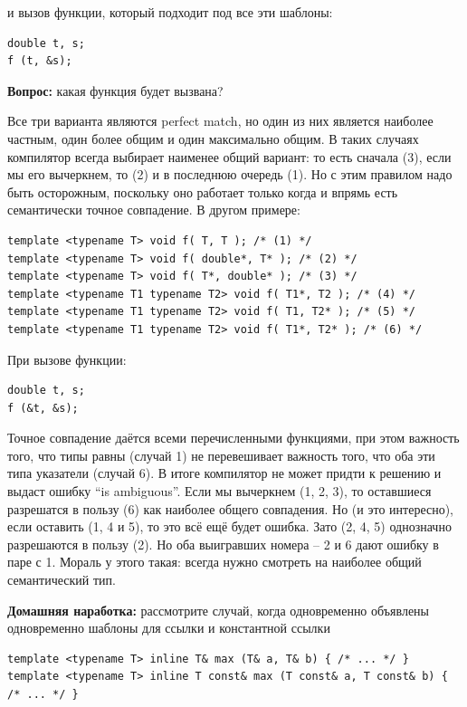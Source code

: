 \documentclass[a4paper,12pt,oneside]{article}
\begin{document}
и вызов функции, который подходит под все эти шаблоны:

\begin{lstlisting}
double t, s;
f (t, &s);
\end{lstlisting}

\textbf{Вопрос:} какая функция будет вызвана?

Все три варианта являются perfect match, но один из них является наиболее частным, один более общим и один максимально общим. В таких случаях компилятор всегда выбирает наименее общий вариант: то есть сначала (3), если мы его вычеркнем, то (2) и в последнюю очередь (1). Но с этим правилом надо быть осторожным, поскольку оно работает только когда и впрямь есть семантически точное совпадение. В другом примере:

\begin{lstlisting}
template <typename T> void f( T, T ); /* (1) */
template <typename T> void f( double*, T* ); /* (2) */
template <typename T> void f( T*, double* ); /* (3) */
template <typename T1 typename T2> void f( T1*, T2 ); /* (4) */
template <typename T1 typename T2> void f( T1, T2* ); /* (5) */
template <typename T1 typename T2> void f( T1*, T2* ); /* (6) */
\end{lstlisting}

При вызове функции:

\begin{lstlisting}
double t, s;
f (&t, &s);
\end{lstlisting}

Точное совпадение даётся всеми перечисленными функциями, при этом важность того, что типы равны (случай 1) не перевешивает важность того, что оба эти типа указатели (случай 6). В итоге компилятор не может придти к решению и выдаст ошибку ``is ambiguous''. Если мы вычеркнем (1, 2, 3), то оставшиеся разрешатся в пользу (6) как наиболее общего совпадения. Но (и это интересно), если оставить (1, 4 и 5), то это всё ещё будет ошибка. Зато (2, 4, 5) однозначно разрешаются в пользу (2). Но оба выигравших номера -- 2 и 6 дают ошибку в паре с 1. Мораль у этого такая: всегда нужно смотреть на наиболее общий семантический тип.

\textbf{Домашняя наработка:} рассмотрите случай, когда одновременно объявлены одновременно шаблоны для ссылки и константной ссылки

\begin{lstlisting}
template <typename T> inline T& max (T& a, T& b) { /* ... */ }
template <typename T> inline T const& max (T const& a, T const& b) { /* ... */ }
\end{lstlisting}
\end{document}
